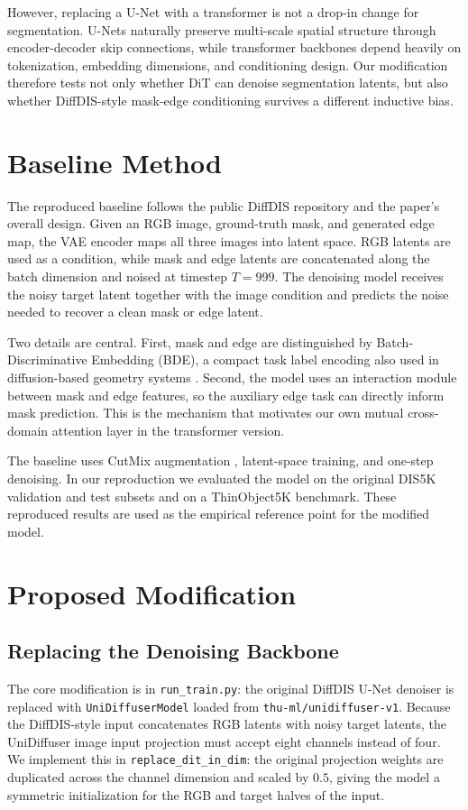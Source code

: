 \documentclass[sigconf,nonacm]{acmart}
\begin{document}
However, replacing a U-Net with a transformer is not a drop-in change for segmentation. U-Nets naturally preserve multi-scale spatial structure through encoder-decoder skip connections, while transformer backbones depend heavily on tokenization, embedding dimensions, and conditioning design. Our modification therefore tests not only whether DiT can denoise segmentation latents, but also whether DiffDIS-style mask-edge conditioning survives a different inductive bias.

\section{Baseline Method}
The reproduced baseline follows the public DiffDIS repository and the paper's overall design. Given an RGB image, ground-truth mask, and generated edge map, the VAE encoder maps all three images into latent space. RGB latents are used as a condition, while mask and edge latents are concatenated along the batch dimension and noised at timestep $T=999$. The denoising model receives the noisy target latent together with the image condition and predicts the noise needed to recover a clean mask or edge latent.

Two details are central. First, mask and edge are distinguished by Batch-Discriminative Embedding (BDE), a compact task label encoding also used in diffusion-based geometry systems \cite{fu2024geowizard}. Second, the model uses an interaction module between mask and edge features, so the auxiliary edge task can directly inform mask prediction. This is the mechanism that motivates our own mutual cross-domain attention layer in the transformer version.

The baseline uses CutMix augmentation \cite{yun2019cutmix}, latent-space training, and one-step denoising. In our reproduction we evaluated the model on the original DIS5K validation and test subsets and on a ThinObject5K benchmark. These reproduced results are used as the empirical reference point for the modified model.

\section{Proposed Modification}
\subsection{Replacing the Denoising Backbone}
The core modification is in \texttt{run\_train.py}: the original DiffDIS U-Net denoiser is replaced with \texttt{UniDiffuserModel} loaded from \texttt{thu-ml/unidiffuser-v1}. Because the DiffDIS-style input concatenates RGB latents with noisy target latents, the UniDiffuser image input projection must accept eight channels instead of four. We implement this in \texttt{replace\_dit\_in\_dim}: the original projection weights are duplicated across the channel dimension and scaled by $0.5$, giving the model a symmetric initialization for the RGB and target halves of the input.
\end{document}
